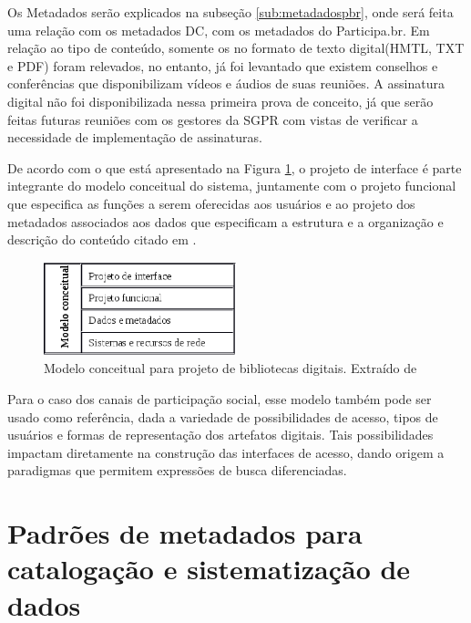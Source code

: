 Os Metadados serão explicados na subseção \ref{sub:metadadospbr}, onde será feita uma relação com os metadados DC, com os metadados do Participa.br. Em relação ao tipo de conteúdo, somente os no formato de texto digital(HMTL, TXT e PDF) foram relevados, no entanto, já foi levantado que existem conselhos e conferências que disponibilizam vídeos e áudios de suas reuniões. A assinatura digital não foi disponibilizada nessa primeira prova de conceito, já que serão feitas futuras reuniões com os gestores da SGPR com vistas de verificar a necessidade de implementação de assinaturas.

De acordo com o que está apresentado na Figura \ref{fig:modelbibdigital}, o projeto de interface é parte integrante do modelo conceitual do sistema, juntamente com o projeto funcional que especifica as funções a serem oferecidas aos usuários e ao projeto dos metadados associados aos dados que especificam a estrutura e a organização e descrição do conteúdo \cite[pp. 143--145]{arms2000digital} citado em \cite[pp. 190]{ferreira2006interface}.

\graphicspath{{figuras/}}
\begin{figure}[H]
\centering
\includegraphics[width=0.5\textwidth]{modelo_biblioteca}
\caption[Modelo conceitual para projeto de bibliotecas digitais]{Modelo conceitual para projeto de bibliotecas digitais. Extraído de \cite[p. 144]{arms2000digital}}
\label{fig:modelbibdigital}
\end{figure}

Para o caso dos canais de participação social, esse modelo também pode ser usado como referência, dada a variedade de possibilidades de acesso, tipos de usuários e formas de representação dos artefatos digitais. Tais possibilidades impactam diretamente na construção das interfaces de acesso, dando origem a paradigmas que permitem expressões de busca diferenciadas. 


\section{Padrões de metadados para catalogação e sistematização de dados}
\label{sec:padraometadado}

